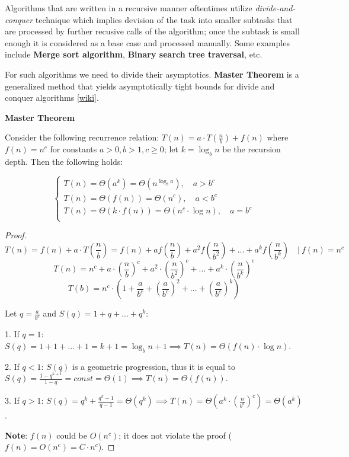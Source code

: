 
Algorithms that are written in a recursive manner oftentimes utilize \textit{divide-and-conquer} technique which implies devision of the task into smaller subtasks that are processed by further recusive calls of the algorithm; once the subtask is small enough it is considered as a base case and processed manually. Some examples include \textbf{Merge sort algorithm}, \textbf{Binary search tree traversal}, etc.

For such algorithms we need to divide their asymptotics. \textbf{Master Theorem} is a generalized method that yields asymptotically tight bounds for divide and conquer algorithms [\href{https://en.wikipedia.org/wiki/Master_theorem_(analysis_of_algorithms)#Generic_form}{wiki}].

\begin{theorem}
    \textbf{Master Theorem}

    Consider the following recurrence relation: $T(n) = a \cdot T(\frac{n}{b}) + f(n)$ where $f(n) = n^c$ for constants $a > 0, b > 1, c \geq 0$; let $k = \log_{b}{n}$ be the recursion depth. Then the following holds:

    \begin{equation}
        \begin{cases}
            T(n) = \Theta(a^k) = \Theta(n^{\log_{b}{a}}), \quad a > b^c\\
            T(n) = \Theta(f(n)) = \Theta(n^c), \quad a < b^c\\
            T(n) = \Theta(k \cdot f(n)) = \Theta(n^c \cdot \log{n}), \quad a = b^c\\
        \end{cases}
    \end{equation}

\end{theorem}



\begin{proof}

    $$ T(n) = f(n) + a \cdot T(\frac{n}{b}) = f(n) + a f(\frac{n}{b}) + a^2 f(\frac{n}{b^2}) + ... + a^k f(\frac{n}{b^k}) \quad | \ f(n)=n^c$$
    $$ T(n) = n^c + a\cdot (\frac{n}{b})^c + a^2\cdot (\frac{n}{b^2})^c + ... + a^k\cdot (\frac{n}{b^k})^c $$
    $$ T(b) = n^c \cdot (1 + \frac{a}{b^c} + (\frac{a}{b^c})^2 + ... + (\frac{a}{b^c})^k) $$

    Let $q = \frac{a}{b^c}$ and $S(q) = 1 + q + ... + q^k$:

    1. If $q=1$: $S(q) = 1 + 1 + ... + 1 = k+1 = \log_{b}{n} + 1 \implies T(n) = \Theta(f(n) \cdot \log{n})$.

    2. If $q<1$: $S(q)$ is a geometric progression, thus it is equal to $S(q) = \frac{1-q^{k+1}}{1-q} = const = \Theta(1) \implies T(n) = \Theta(f(n))$.

    3. If $q>1$: $S(q) = q^k + \frac{q^k-1}{q-1} = \Theta(q^k) \implies T(n) = \Theta(a^k \cdot (\frac{n}{b^k})^c) = \Theta(a^k)$.

    \textbf{Note}: $f(n)$ could be $O(n^c)$; it does not violate the proof ($f(n) = O(n^c) = C \cdot n^c$).

\end{proof}



